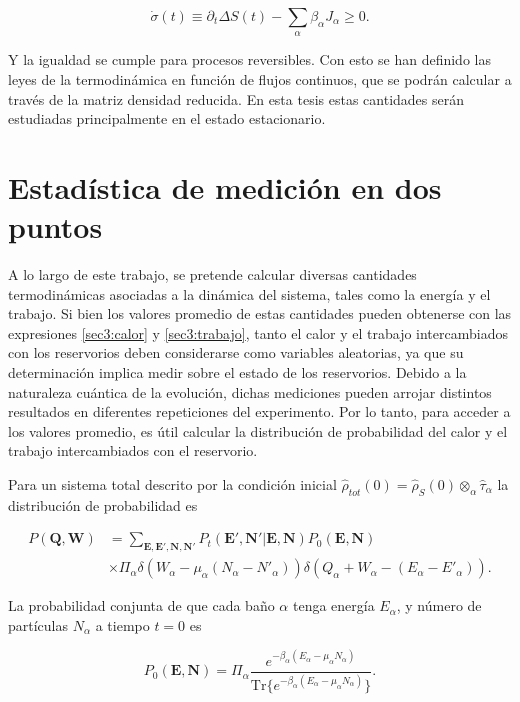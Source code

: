 \begin{equation*}
    \dot{\sigma}(t) \equiv \partial_{t}\Delta S(t) - \sum_{\alpha}\beta_{\alpha}J_{\alpha} \geq 0.
\end{equation*}

Y la igualdad se cumple para procesos reversibles. Con esto se han definido las leyes de la termodinámica en función de flujos continuos, que se podrán calcular a través de la matriz densidad reducida. En esta tesis estas cantidades serán estudiadas principalmente en el estado estacionario.

\label{sec3sub:leyestermo}

\section{Estadística de medición en dos puntos}
A lo largo de este trabajo, se pretende calcular diversas cantidades termodinámicas asociadas a la dinámica del sistema, tales como la energía y el trabajo. Si bien los valores promedio de estas cantidades pueden obtenerse con las expresiones \ref{sec3:calor} y \ref{sec3:trabajo}, tanto el calor y el trabajo intercambiados con los reservorios deben considerarse como variables aleatorias, ya que su determinación implica medir sobre el estado de los reservorios. Debido a la naturaleza cuántica de la evolución, dichas mediciones pueden arrojar distintos resultados en diferentes repeticiones del experimento. Por lo tanto, para acceder a los valores promedio, es útil calcular la distribución de probabilidad del calor y el trabajo intercambiados con el reservorio.

Para  un sistema total descrito por la condición inicial $\hat{\rho}_{tot}(0) = \hat{\rho}_{S}(0) \otimes_{\alpha} \hat{\tau}_{\alpha}$ la distribución de probabilidad es   

\begin{align*}
    P(\textbf{Q},\textbf{W}) & = \sum_{\textbf{E},\textbf{E}',\textbf{N},\textbf{N}'} P_{t}(\textbf{E}',\textbf{N}'|\textbf{E},\textbf{N}) P_{0}(\textbf{E},\textbf{N})\\
                             & \times \Pi_{\alpha} \delta(W_{\alpha} - \mu_{\alpha}(N_{\alpha} - N'_{\alpha})) \delta(Q_{\alpha} + W_{\alpha}  - (E_{\alpha} - E'_{\alpha})).   
\end{align*}

La probabilidad conjunta de que cada baño $\alpha$ tenga energía $E_{\alpha}$, y número de partículas $N_{\alpha}$ a tiempo $t=0$ es

\begin{equation*}
    P_{0}(\textbf{E},\textbf{N}) = \Pi_{\alpha}  \frac{e^{-\beta_{\alpha}(E_{\alpha} - \mu_{\alpha}N_{\alpha} )  }}{ \text{Tr}\{e^{-\beta_{\alpha}(E_{\alpha} - \mu_{\alpha}N_{\alpha} )  }\} }.
\end{equation*}

